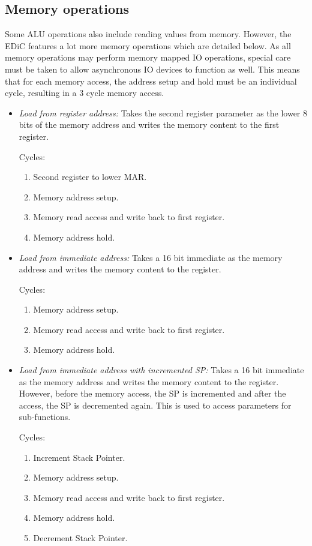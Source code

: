 \subsection{Memory operations} Some \gls{ALU} operations also include reading values from memory.
However, the \gls{EDiC} features a lot more memory operations which are detailed below.
As all memory operations may perform memory mapped \gls{IO} operations, special care must be taken to allow asynchronous \gls{IO} devices to function as well.
This means that for each memory access, the address setup and hold must be an individual cycle, resulting in a 3 cycle memory access.
\begin{itemize}
  \item \emph{Load from register address:} Takes the second register parameter as the lower 8 bits of the memory address and writes the memory content to the first register.

  Cycles:
  \begin{enumerate}
    \item Second register to lower \gls{MAR}.
    \item Memory address setup.
    \item Memory read access and write back to first register.
    \item Memory address hold.
  \end{enumerate}

  \item \emph{Load from immediate address:} Takes a 16 bit immediate as the memory address and writes the memory content to the register.

  Cycles:
  \begin{enumerate}
    \item Memory address setup.
    \item Memory read access and write back to first register.
    \item Memory address hold.
  \end{enumerate}

  \item \emph{Load from immediate address with incremented \gls{SP}:} Takes a 16 bit immediate as the memory address and writes the memory content to the register.
  However, before the memory access, the \gls{SP} is incremented and after the access, the \gls{SP} is decremented again.
  This is used to access parameters for sub-functions.

  Cycles:
  \begin{enumerate}
    \item Increment Stack Pointer.
    \item Memory address setup.
    \item Memory read access and write back to first register.
    \item Memory address hold.
    \item Decrement Stack Pointer.
  \end{enumerate}


\end{itemize}
